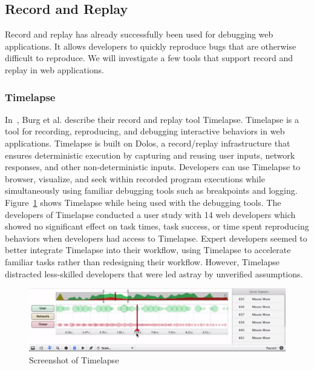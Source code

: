 \subsection{Record and Replay}

Record and replay has already successfully been used for debugging web applications. It allows developers to quickly reproduce bugs that are otherwise difficult to reproduce. We will investigate a few tools that support record and replay in web applications.

\subsubsection{Timelapse}

In~\cite{timelapse2013}, Burg et al. describe their record and replay tool Timelapse. Timelapse is a tool for recording, reproducing, and debugging interactive behaviors in web applications. Timelapse is built on Dolos, a record/replay infrastructure that ensures deterministic execution by capturing and reusing user inputs, network responses, and other non-deterministic inputs. Developers can use Timelapse to browser, visualize, and seek within recorded program executions while simultaneously using familiar debugging tools such as breakpoints and logging. Figure~\ref{fig:timelapse} shows Timelapse while being used with the debugging tools. The developers of Timelapse conducted a user study with 14 web developers which showed no significant effect on task times, task success, or time spent reproducing behaviors when developers had access to Timelapse. Expert developers seemed to better integrate Timelapse into their workflow, using Timelapse to accelerate familiar tasks rather than redesigning their workflow. However, Timelapse distracted less-skilled developers that were led astray by unverified assumptions.

\begin{figure}[H]
  \centering
    \includegraphics[width=1.0\textwidth]{images/relatedwork/timelapse.png}
	\caption[Screenshot: Timelapse]{Screenshot of Timelapse}
	\label{fig:timelapse}
\end{figure}


